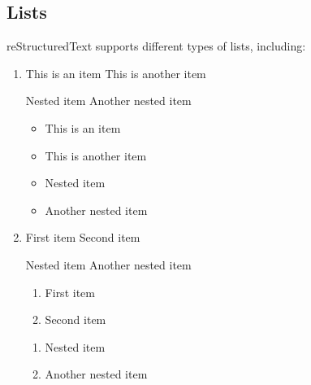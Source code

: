 \documentclass[a4paper,10pt,english]{sphinxmanual}
\begin{document}
\subsection{Lists}
\label{\detokenize{page_two:lists}}
\sphinxAtStartPar
reStructuredText supports different types of lists, including:
\begin{enumerate}
%
\item {} 
\sphinxAtStartPar
{}

\begin{sphinxVerbatim}[commandchars=\\\{\}]
 This is an item
 This is another item

   Nested item
   Another nested item
\end{sphinxVerbatim}
\begin{itemize}
\item {} 
\sphinxAtStartPar
This is an item

\item {} 
\sphinxAtStartPar
This is another item

\end{itemize}
\begin{itemize}
\item {} 
\sphinxAtStartPar
Nested item

\item {} 
\sphinxAtStartPar
Another nested item

\end{itemize}

\item {} 
\sphinxAtStartPar
{}

\begin{sphinxVerbatim}[commandchars=\\\{\}]
 First item
 Second item

   Nested item
   Another nested item
\end{sphinxVerbatim}
\begin{enumerate}
%
\item {} 
\sphinxAtStartPar
First item

\item {} 
\sphinxAtStartPar
Second item

\end{enumerate}
\begin{enumerate}
%
\item {} 
\sphinxAtStartPar
Nested item

\item {} 
\sphinxAtStartPar
Another nested item

\end{enumerate}

\end{enumerate}
\end{document}
